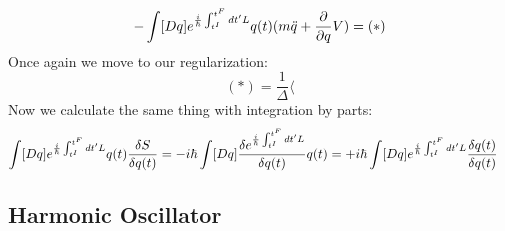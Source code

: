 \documentclass{article}
\begin{document}
\begin{equation}
   - \int [Dq] e^{\frac{i}{\hbar}\int_{t^I}^{t^F}dt'L}q(t)(m\ddot{q}+\pdv{q}V)=(*)
\end{equation}
Once again we move to our regularization:
\begin{equation*}
    (*)=\frac{1}{\Delta}\langle 
\end{equation*}
Now we calculate the same thing with integration by parts:
\begin{equation} 
\begin{split}
        \int [Dq] e^{\frac{i}{\hbar}\int_{t^I}^{t^F}dt'L}q(t)\fdv{S}{q(t)} 
        = -i\hbar\int [Dq] \fdv{e^{\frac{i}{\hbar}\int_{t^I}^{t^F}dt'L}}{q(t)}q(t)
        &= +i\hbar\int [Dq] e^{\frac{i}{\hbar}\int_{t^I}^{t^F}dt'L}\fdv{q(t)}{q(t)}
\end{split}
\end{equation}
\subsection*{Harmonic Oscillator}
\end{document}
